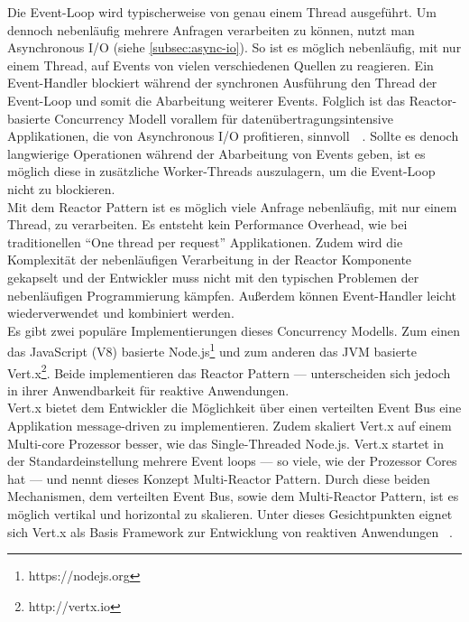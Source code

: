 Die Event-Loop wird typischerweise von genau einem Thread ausgeführt. Um dennoch nebenläufig mehrere Anfragen verarbeiten zu können, nutzt man Asynchronous I/O (siehe \ref{subsec:async-io}). So ist es möglich nebenläufig, mit nur einem Thread, auf Events von vielen verschiedenen Quellen zu reagieren. Ein Event-Handler blockiert während der synchronen Ausführung den Thread der Event-Loop und somit die Abarbeitung weiterer Events. Folglich ist das Reactor-basierte Concurrency Modell vorallem für datenübertragungsintensive Applikationen, die von Asynchronous I/O profitieren, sinnvoll~\cite[S.~73]{kuhn_reactive_2015}~\cite[S.~92]{erb_concurrent_2012}. Sollte es denoch langwierige Operationen während der Abarbeitung von Events geben, ist es möglich diese in zusätzliche Worker-Threads auszulagern, um die Event-Loop nicht zu blockieren.\\
Mit dem Reactor Pattern ist es möglich viele Anfrage nebenläufig, mit nur einem Thread, zu verarbeiten. Es entsteht kein Performance Overhead, wie bei traditionellen \enquote{One thread per request} Applikationen. Zudem wird die Komplexität der nebenläufigen Verarbeitung in der Reactor Komponente gekapselt und der Entwickler muss nicht mit den typischen Problemen der nebenläufigen Programmierung kämpfen. Außerdem können Event-Handler leicht wiederverwendet und kombiniert werden.\\
Es gibt zwei populäre Implementierungen dieses Concurrency Modells. Zum einen das JavaScript (V8) basierte Node.js\footnote{https://nodejs.org} und zum anderen das JVM basierte Vert.x\footnote{http://vertx.io}. Beide implementieren das Reactor Pattern --- unterscheiden sich jedoch in ihrer Anwendbarkeit für reaktive Anwendungen.\\
Vert.x bietet dem Entwickler die Möglichkeit über einen verteilten Event Bus eine Applikation message-driven zu implementieren. Zudem skaliert Vert.x auf einem Multi-core Prozessor besser, wie das Single-Threaded Node.js. Vert.x startet in der Standardeinstellung mehrere Event loops --- so viele, wie der Prozessor Cores hat --- und nennt dieses Konzept Multi-Reactor Pattern. Durch diese beiden Mechanismen, dem verteilten Event Bus, sowie dem Multi-Reactor Pattern, ist es möglich vertikal und horizontal zu skalieren. Unter dieses Gesichtpunkten eignet sich Vert.x als Basis Framework zur Entwicklung von reaktiven Anwendungen~\cite[S.~74]{kuhn_reactive_2015} \cite[S.~93~\&~S.~94]{erb_concurrent_2012}.

\pagebreak

